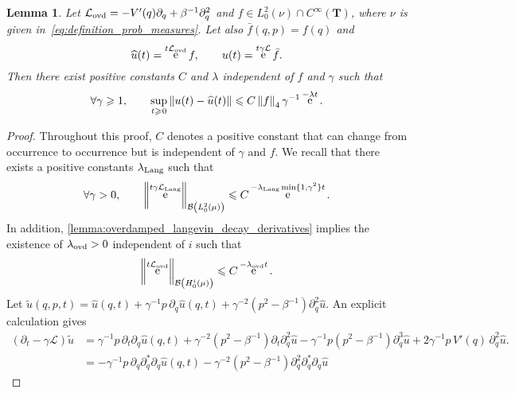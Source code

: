 \documentclass[11pt,a4paper]{article}
\DeclareMathOperator{\e}{e}
\newcommand{\torus}{\mathbf T}
\theoremstyle{plain}
\newtheorem{lemma}{Lemma}[section]
\numberwithin{equation}{section}
\renewcommand{\leq}{\leqslant}
\renewcommand{\geq}{\geqslant}
\begin{document}
\begin{lemma}
    \label{lemma:backward_kolmogorov_obs_q}
    Let $\mathcal L_{\rm ovd} = - V'(q) \partial_q + \beta^{-1} \partial_q^2$ and $f \in L^2_0(\nu) \cap C^{\infty}(\torus)$,
    where $\nu$ is given in~\eqref{eq:definition_prob_measures}.
    Let also $\bar f(q, p) = f(q)$ and
    \[
        \widehat u(t) = \e^{t\mathcal L_{\rm ovd}} f, \qquad
        u(t) = \e^{t \gamma\mathcal L} \bar f.
    \]
    Then there exist positive constants $C$ and $\lambda$ independent of $f$ and $\gamma$ such that
    \[
        \forall \gamma \geq 1, \qquad
        \sup_{t \geq \!\!0}
        \norm{u(t)  - \widehat u(t)} \leq
        C \norm{f}_4 \gamma^{-1} \e^{-\lambda t}.
    \]
\end{lemma}
\begin{proof}
    Throughout this proof, $C$ denotes a positive constant that can change from occurrence to occurrence but is independent of $\gamma$ and $f$.
    We recall that there exists a positive constants $\lambda_{\rm Lang}$ such that~\cite{roussel2018spectral,pavliotis2011applied}
    \begin{equation}
        \label{eq:decay_langevin}
        \forall \gamma > 0, \qquad
        \norm{\e^{t \gamma \mathcal L_{\rm Lang}}}[\mathcal B\left(L^2_0(\mu)\right)] \leq C \e^{- \lambda_{\rm Lang} \min\{1,\gamma^2\} t}.
    \end{equation}
    In addition, \cref{lemma:overdamped_langevin_decay_derivatives} implies the existence of $\lambda_{\rm ovd} > 0$ independent of $i$ such that
    \begin{equation}
        \label{eq:decay_ovd}
        \norm{\e^{t \mathcal L_{\rm ovd}}}[\mathcal B\left(H^i_0(\mu)\right)] \leq C \e^{- \lambda_{\rm ovd} t}.
    \end{equation}
    Let
    \(
        \widetilde u(q, p, t) =
        \widehat u(q, t)
        + \gamma^{-1} p \, \partial_q \widehat u(q, t)
        + \gamma^{-2} (p^2 - \beta^{-1}) \partial_q^{2} \widehat u.
    \)
    An explicit calculation gives
    \begin{align*}
        (\partial_t - \gamma \mathcal L) \widetilde u
        &= \gamma^{-1} p \, \partial_t \partial_q \widehat u(q, t) + \gamma^{-2} (p^2 - \beta^{-1}) \partial_t \partial_q^{2} \widehat u
        - \gamma^{-1} p (p^2 - \beta^{-1}) \partial_q^{3} \widehat u + 2 \gamma^{-1} p \, V'(q) \, \partial_q^2 \widehat u.\\
        &= - \gamma^{-1} p \, \partial_q \partial_q^* \partial_q \widehat u(q, t) - \gamma^{-2} (p^2 - \beta^{-1})  \partial_q^{2} \partial_q^* \partial_q \widehat u

\end{align*}
\end{proof}
\end{document}
